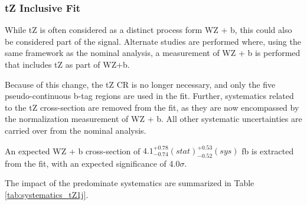 
\subsubsection{tZ Inclusive Fit}
\label{sec:inc_tZ}

While tZ is often considered as a distinct process form WZ + b, this could also be considered part of the signal. Alternate studies are performed where, using the same framework as the nominal analysis, a measurement of WZ + b is performed that includes tZ as part of WZ+b. 

Because of this change, the tZ CR is no longer necessary, and only the five pseudo-continuous b-tag regions are used in the fit. Further, systematics related to the tZ cross-section are removed from the fit, as they are now encompassed by the normalization measurement of WZ + b. All other systematic uncertainties are carried over from the nominal analysis.



An expected WZ + b cross-section of $4.1^{+0.78}_{-0.74} (stat)^{+0.53}_{-0.52}(sys)$ fb is extracted from the fit, with an expected significance of 4.0$\sigma$.

The impact of the predominate systematics are summarized in Table \ref{tab:systematics_tZ1j}.


